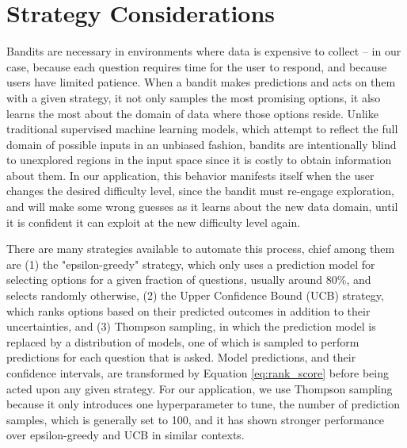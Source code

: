 \documentclass[manuscript, nonacm]{acmart_no_footer}
\begin{document}
\section{Strategy Considerations}

Bandits are necessary in environments where data is expensive to collect -- in our case, because each question requires time for the user to respond, and because users have limited patience. When a bandit makes predictions and acts on them with a given strategy, it not only samples the most promising options, it also learns the most about the domain of data where those options reside. Unlike traditional supervised machine learning models, which attempt to reflect the full domain of possible inputs in an unbiased fashion, bandits are intentionally blind to unexplored regions in the input space since it is costly to obtain information about them. In our application, this behavior manifests itself when the user changes the desired difficulty level, since the bandit must re-engage exploration, and will make some wrong guesses as it learns about the new data domain, until it is confident it can exploit at the new difficulty level again.

There are many strategies available to automate this process, chief among them are (1) the "epsilon-greedy" strategy\cite{bandit_website_optimization}, which only uses a prediction model for selecting options for a given fraction of questions, usually around 80\%, and selects randomly otherwise, (2) the Upper Confidence Bound (UCB) strategy\cite{UCB}, which ranks options based on their predicted outcomes in addition to their uncertainties, and (3) Thompson sampling\cite{thompson_sampling1, thompson_sampling2, bootstrap_facebook}, in which the prediction model is replaced by a distribution of models, one of which is sampled to perform predictions for each question that is asked. Model predictions, and their confidence intervals, are transformed by Equation \ref{eq:rank_score} before being acted upon any given strategy. For our application, we use Thompson sampling because it only introduces one hyperparameter to tune, the number of prediction samples, which is generally set to 100, and it has shown stronger performance over epsilon-greedy and UCB in similar contexts\cite{thompson_sampling3}. 
\end{document}
